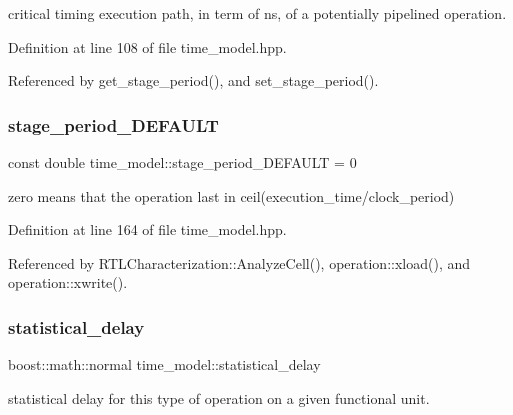 critical timing execution path, in term of ns, of a potentially pipelined operation. 



Definition at line 108 of file time\+\_\+model.\+hpp.



Referenced by get\+\_\+stage\+\_\+period(), and set\+\_\+stage\+\_\+period().

\mbox{\label{classtime__model_a5ec0e13fa38fb22ff03d6cffd8fbd0fd}} 
\subsubsection{\texorpdfstring{stage\+\_\+period\+\_\+\+D\+E\+F\+A\+U\+LT}{stage\_period\_DEFAULT}}
{\footnotesize\ttfamily const double time\+\_\+model\+::stage\+\_\+period\+\_\+\+D\+E\+F\+A\+U\+LT = 0\hspace{0.3cm}{\ttfamily [static]}}



zero means that the operation last in ceil(execution\+\_\+time/clock\+\_\+period) 



Definition at line 164 of file time\+\_\+model.\+hpp.



Referenced by R\+T\+L\+Characterization\+::\+Analyze\+Cell(), operation\+::xload(), and operation\+::xwrite().

\mbox{\label{classtime__model_a43b9fc3be5b91ce6158883eee3497f50}} 
\subsubsection{\texorpdfstring{statistical\+\_\+delay}{statistical\_delay}}
{\footnotesize\ttfamily boost\+::math\+::normal time\+\_\+model\+::statistical\+\_\+delay}



statistical delay for this type of operation on a given functional unit. 



